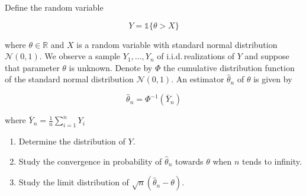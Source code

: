 \begin{Exercise}
  Define the random variable

  \[
    Y=\mathbb{1}\{\theta>X\}
  \]

  where $\theta \in \mathbb{R}$ and $X$ is a random variable with standard normal
  distribution $\mathcal{N}(0,1)$. We observe a sample $Y_{1}, \ldots, Y_{n}$ of
  i.i.d.\,realizations of $Y$ and suppose that parameter $\theta$ is unknown.
  Denote by $\Phi$ the cumulative distribution function of the standard normal
  distribution $\mathcal{N}(0,1)$. An estimator $\hat{\theta}_{n}$ of $\theta$ is
  given by

  \[
    \hat{\theta}_{n}=\Phi^{-1}\left(\bar{Y}_{n}\right)
  \]

  where $\bar{Y}_{n}=\frac{1}{n} \sum_{i=1}^{n} Y_{i}$

  \begin{enumerate}
    \item Determine the distribution of $Y$.

    \item Study the convergence in probability of $\hat{\theta}_{n}$ towards $\theta$
          when $n$ tends to infinity.

    \item Study the limit distribution of $\sqrt{n}\left(\hat{\theta}_{n}-\theta\right)$.

  \end{enumerate}
\end{Exercise}

